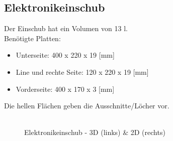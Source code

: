 \subsection{Elektronikeinschub}
Der Einschub hat ein Volumen von 13 l.\\
Benötigte Platten:
\begin{itemize}
	\item Unterseite: 400 x 220 x 19 [mm]
	\item Line und rechte Seite: 120 x 220 x 19 [mm]
	\item Vorderseite: 400 x 170 x 3 [mm]
\end{itemize}
Die hellen Flächen geben die Ausschnitte/Löcher vor.\\ \\
\begin{figure} [H]
	\centering
	\quad
	\caption{Elektronikeinschub - 3D (links) \& 2D (rechts)}
	\label{fig:8.11.2}
\end{figure}


\newpage
